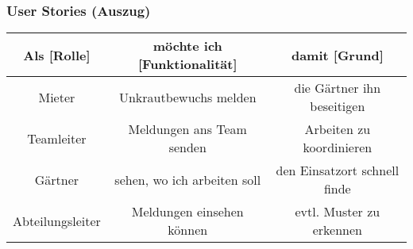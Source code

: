 \begin{frame}
  \frametitle{User Stories (Auszug)}

  \begin{table}
    \centering
    \begin{tabular}{||c|c|c||}
      \hline
      \textbf{Als [Rolle]} & \textbf{möchte ich [Funktionalität]} & \textbf{damit [Grund]}\\
      \hline
      Mieter & Unkrautbewuchs melden & die Gärtner ihn beseitigen \\
      \hline
      Teamleiter & Meldungen ans Team senden & Arbeiten zu koordinieren \\
      \hline
      Gärtner &  sehen, wo ich arbeiten soll & den Einsatzort schnell finde \\
      \hline
      Abteilungsleiter &  Meldungen einsehen können & evtl. Muster zu erkennen \\
      \hline
    \end{tabular}
  \end{table}
\end{frame}
